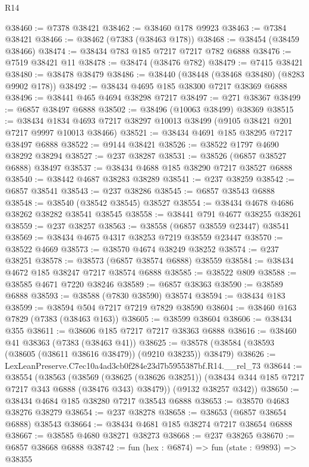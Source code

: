 \begin{lexlean}{R14}
\begin{coremodule}
@38460 := @7378 @38421
@38462 := @38460 @178 @9923
@38463 := @7384 @38421
@38466 := @38462 (@7383 (@38463 @178))
@38468 := @38454 (@38459 @38466)
@38474 := @38434 @783 @185 @7217 @7217 @782 @6888
@38476 := @7519 @38421 @11
@38478 := @38474 (@38476 @782)
@38479 := @7415 @38421
@38480 := @38478 @38479
@38486 := @38440 (@38448 (@38468 @38480) (@8283 @9902 @178))
@38492 := @38434 @4695 @185 @38300 @7217 @38369 @6888
@38496 := @38441 @465 @4694 @38298 @7217
@38497 := @271 @38367
@38499 := @6857 @38497 @6888
@38502 := @38496 (@10063 @38499) @38369
@38515 := @38434
    @1834
    @4693
    @7217
    @38297
    @10013
    @38499
    (@9105 @38421 @201 @7217 @9997 @10013 @38466)
@38521 := @38434 @4691 @185 @38295 @7217 @38497 @6888
@38522 := @9144 @38421
@38526 := @38522 @1797 @4690 @38292 @38294
@38527 := @237 @38287
@38531 := @38526 (@6857 @38527 @6888) @38497
@38537 := @38434 @4688 @185 @38290 @7217 @38527 @6888
@38540 := @38442 @4687 @38283 @38289
@38541 := @237 @38259
@38542 := @6857 @38541
@38543 := @237 @38286
@38545 := @6857 @38543 @6888
@38548 := @38540 (@38542 @38545) @38527
@38554 := @38434 @4678 @4686 @38262 @38282 @38541 @38545
@38558 := @38441 @791 @4677 @38255 @38261
@38559 := @237 @38257
@38563 := @38558 (@6857 @38559 @23447) @38541
@38569 := @38434 @4675 @4317 @38253 @7219 @38559 @23447
@38570 := @38522 @4669
@38573 := @38570 @4674 @38249 @38252
@38574 := @237 @38251
@38578 := @38573 (@6857 @38574 @6888) @38559
@38584 := @38434 @4672 @185 @38247 @7217 @38574 @6888
@38585 := @38522 @809
@38588 := @38585 @4671 @7220 @38246
@38589 := @6857 @38363
@38590 := @38589 @6888
@38593 := @38588 (@7830 @38590) @38574
@38594 := @38434 @183
@38599 := @38594 @504 @7217 @7219 @7829 @38590
@38604 := @38460 @163 @7829 (@7383 (@38463 @163))
@38605 := @38599 @38604
@38606 := @38434 @355
@38611 := @38606 @185 @7217 @7217 @38363 @6888
@38616 := @38460 @41 @38363 (@7383 (@38463 @41))
@38625 := @38578 (@38584 (@38593 (@38605 (@38611 @38616 @38479)) (@9210 @38235)) @38479)
@38626 := LexLeanPreserve.C7ec10a4ad3cb0f284e23d7b5955387bf.R14.__rel_73
@38644 := @38554
    (@38563
      (@38569
        (@38625 (@38626 @38251))
        (@38434 @344 @185 @7217 @7217 @343 @6888 (@38476 @343) @38479))
      (@9132 @38257 @342))
@38650 := @38434 @4684 @185 @38280 @7217 @38543 @6888
@38653 := @38570 @4683 @38276 @38279
@38654 := @237 @38278
@38658 := @38653 (@6857 @38654 @6888) @38543
@38664 := @38434 @4681 @185 @38274 @7217 @38654 @6888
@38667 := @38585 @4680 @38271 @38273
@38668 := @237 @38265
@38670 := @6857 @38668 @6888
@38742 := fun (hex : @6874) =>
  fun (state : @9893) =>
  @38355

\end{coremodule}
\end{lexlean}
